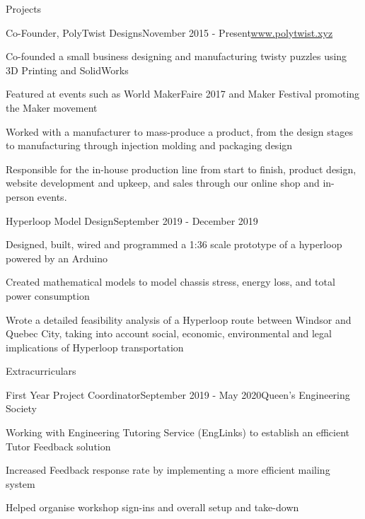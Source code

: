 \documentclass{resume} %
\begin{document}
\begin{rSection}{Projects}

\begin{rSubsection}{Co-Founder, PolyTwist Designs}{November 2015 - Present}{\url{www.polytwist.xyz}}{}
\item Co-founded a small business designing and manufacturing twisty puzzles using 3D Printing and SolidWorks
\item Featured at events such as World MakerFaire 2017 and Maker Festival promoting the Maker movement
\item Worked with a manufacturer to mass-produce a product, from the design stages to manufacturing through injection molding and packaging design
\item Responsible for the in-house production line from start to finish, product design, website development and upkeep, and sales through our online shop and in-person events.
\end{rSubsection}

\begin{rSubsection}{Hyperloop Model Design}{September 2019 - December 2019}{}{}
\item Designed, built, wired and programmed a 1:36 scale prototype of a hyperloop powered by an Arduino
\item Created mathematical models to model chassis stress, energy loss, and total power consumption
\item Wrote a detailed feasibility analysis of a Hyperloop route between Windsor and Quebec City, taking into account social, economic, environmental and legal implications of Hyperloop transportation
\end{rSubsection}


\end{rSection}



\begin{rSection}{Extracurriculars}
\begin{rSubsection}{First Year Project Coordinator}{September 2019 - May 2020}{Queen's Engineering Society}{}
\item Working with Engineering Tutoring Service (EngLinks) to establish an efficient Tutor Feedback solution
\item Increased Feedback response rate by implementing a more efficient mailing system
\item Helped organise workshop sign-ins and overall setup and take-down

\end{rSubsection}

\end{rSection}
\end{document}
